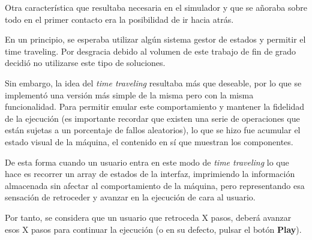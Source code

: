 Otra característica que resultaba necesaria en el simulador y que se añoraba sobre todo en el primer
contacto era la posibilidad de ir hacia atrás.

\bigskip
En un principio, se esperaba utilizar algún sistema gestor de estados y permitir el time traveling. 
Por desgracia debido al volumen de este trabajo de fin de grado decidió no utilizarse este tipo de 
soluciones.

\bigskip
Sin embargo, la idea del \textit{time traveling} resultaba más que deseable, por lo que se implementó
una versión más simple de la misma pero con la misma funcionalidad. Para permitir emular este 
comportamiento y mantener la fidelidad de la ejecución (es importante recordar que existen una serie de operaciones que están sujetas a un porcentaje de fallos
aleatorios), lo que se hizo fue acumular el estado visual de la máquina, el contenido en sí que muestran
los componentes.

\bigskip
De esta forma cuando un usuario entra en este modo de \textit{time traveling} lo que hace es
 recorrer un array de estados de la interfaz, imprimiendo la información almacenada sin afectar 
 al comportamiento de la máquina, pero representando esa sensación de retroceder y avanzar
 en la ejecución de cara al usuario.

\bigskip
Por tanto, se considera que un usuario que retroceda X pasos, deberá avanzar esos X pasos para continuar
la ejecución (o en su defecto, pulsar el botón \textbf{Play}).